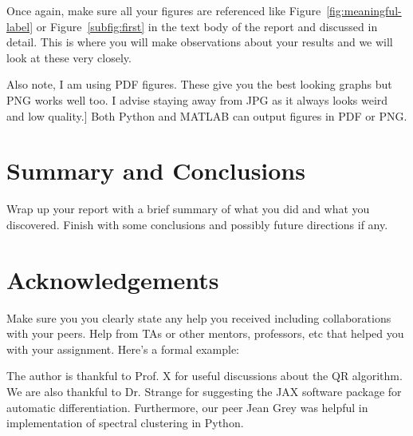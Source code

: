 \documentclass[11pt]{amsart}
\begin{document}
Once again, make sure all your figures are referenced like Figure~\ref{fig:meaningful-label}
or Figure~\ref{subfig:first} in the text body of the report and discussed 
in detail. This is where you will make observations about your results and we will 
look at these very closely. 

Also note, I am using PDF figures. These give you the best looking graphs but PNG works 
well too. I advise staying away from JPG as it always looks weird and low quality.]
Both Python and MATLAB can output figures in PDF or PNG.

\section{Summary and Conclusions}\label{sec:conclusions}
Wrap up your report with a brief summary of what you did and what you discovered. 
Finish with some conclusions and possibly future directions if any. 

\section*{Acknowledgements}

Make sure you you clearly state any help you received including collaborations 
with your peers. Help from TAs or other mentors, professors, etc that helped you 
with your assignment. Here's a formal example: 

The author is thankful to Prof. X for useful discussions about the QR algorithm. 
We are also thankful to Dr. Strange for suggesting the JAX software package for 
automatic differentiation. Furthermore, our peer Jean Grey was helpful in 
implementation of spectral clustering in Python.


\end{document}
